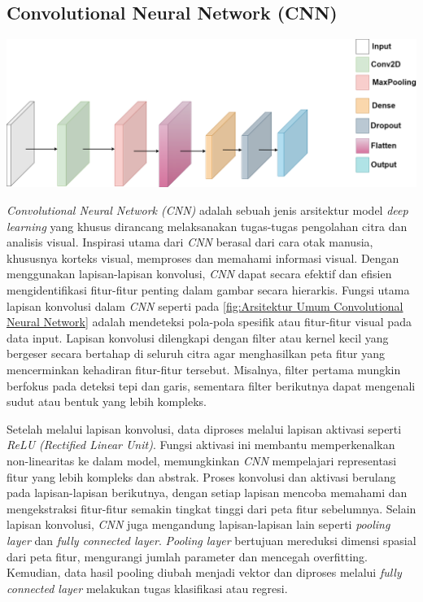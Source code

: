 \subsection{Convolutional Neural Network (CNN)}
\begin{center}
  \includegraphics[width=0.8\linewidth]{gambar/bener/Arsitektur_CNN_Umum.png}
  \label{fig:Arsitektur Umum Convolutional Neural Network}
\end{center}
\textit{Convolutional Neural Network (CNN)} adalah sebuah jenis arsitektur model \textit{deep learning} yang khusus dirancang melaksanakan tugas-tugas pengolahan citra dan analisis visual. Inspirasi utama dari \textit{CNN} berasal dari cara otak manusia, khususnya korteks visual, memproses dan memahami informasi visual. Dengan menggunakan lapisan-lapisan konvolusi, \textit{CNN} dapat secara efektif dan efisien mengidentifikasi fitur-fitur penting dalam gambar secara hierarkis. Fungsi utama lapisan konvolusi dalam \textit{CNN} seperti pada \ref{fig:Arsitektur Umum Convolutional Neural Network}
adalah mendeteksi pola-pola spesifik atau fitur-fitur visual pada data input. Lapisan konvolusi dilengkapi dengan filter atau kernel kecil yang bergeser secara bertahap di seluruh citra agar menghasilkan peta fitur yang mencerminkan kehadiran fitur-fitur tersebut. Misalnya, filter pertama mungkin berfokus pada deteksi tepi dan garis, sementara filter berikutnya dapat mengenali sudut atau bentuk yang lebih kompleks. \cite{wu2017introduction}

Setelah melalui lapisan konvolusi, data diproses melalui lapisan aktivasi seperti \textit{ReLU (Rectified Linear Unit)}. Fungsi aktivasi ini membantu memperkenalkan non-linearitas ke dalam model, memungkinkan \textit{CNN} mempelajari representasi fitur yang lebih kompleks dan abstrak. Proses konvolusi dan aktivasi berulang pada lapisan-lapisan berikutnya, dengan setiap lapisan mencoba memahami dan mengekstraksi fitur-fitur semakin tingkat tinggi dari peta fitur sebelumnya. Selain lapisan konvolusi, \textit{CNN} juga mengandung lapisan-lapisan lain seperti \textit{pooling layer} dan \textit{fully connected layer}. \textit{Pooling layer} bertujuan mereduksi dimensi spasial dari peta fitur, mengurangi jumlah parameter dan mencegah overfitting. Kemudian, data hasil pooling diubah menjadi vektor dan diproses melalui \textit{fully connected layer} melakukan tugas klasifikasi atau regresi. \cite{koushik2016understanding}

